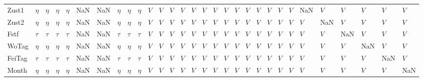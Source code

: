\begin{tabular}{llllllllllllllllllllllllllllll}
Zust1  &    $\eta$ &    $\eta$ &    $\eta$ &    $\eta$ &   NaN &   NaN &    $\eta$ &    $\eta$ &    $\eta$ &     $V$ &     $V$ &     $V$ &     $V$ &     $V$ &     $V$ &     $V$ &     $V$ &     $V$ &       $V$ &     $V$ &     $V$ &     $V$ &     $V$ &     NaN &     $V$ &     $V$ &     $V$ &     $V$ &     $V$ \\
Zust2  &    $\eta$ &    $\eta$ &    $\eta$ &    $\eta$ &   NaN &   NaN &    $\eta$ &    $\eta$ &    $\eta$ &     $V$ &     $V$ &     $V$ &     $V$ &     $V$ &     $V$ &     $V$ &     $V$ &     $V$ &       $V$ &     $V$ &     $V$ &     $V$ &     $V$ &     $V$ &     NaN &     $V$ &     $V$ &     $V$ &     $V$ \\
Fstf   &    $\tau$ &    $\tau$ &    $\tau$ &    $\tau$ &   NaN &   NaN &    $\tau$ &    $\tau$ &    $\tau$ &     $V$ &     $V$ &     $V$ &     $V$ &     $V$ &     $V$ &     $V$ &     $V$ &     $V$ &       $V$ &     $V$ &     $V$ &     $V$ &     $V$ &     $V$ &     $V$ &     NaN &     $V$ &     $V$ &     $V$ \\
WoTag  &    $\eta$ &    $\eta$ &    $\eta$ &    $\eta$ &   NaN &   NaN &    $\eta$ &    $\eta$ &    $\eta$ &     $V$ &     $V$ &     $V$ &     $V$ &     $V$ &     $V$ &     $V$ &     $V$ &     $V$ &       $V$ &     $V$ &     $V$ &     $V$ &     $V$ &     $V$ &     $V$ &     $V$ &     NaN &     $V$ &     $V$ \\
FeiTag &    $\tau$ &    $\tau$ &    $\tau$ &    $\tau$ &   NaN &   NaN &    $\tau$ &    $\tau$ &    $\tau$ &     $V$ &     $V$ &     $V$ &     $V$ &     $V$ &     $V$ &     $V$ &     $V$ &     $V$ &       $V$ &     $V$ &     $V$ &     $V$ &     $V$ &     $V$ &     $V$ &     $V$ &     $V$ &     NaN &     $V$ \\
Month  &    $\eta$ &    $\eta$ &    $\eta$ &    $\eta$ &   NaN &   NaN &    $\eta$ &    $\eta$ &    $\eta$ &     $V$ &     $V$ &     $V$ &     $V$ &     $V$ &     $V$ &     $V$ &     $V$ &     $V$ &       $V$ &     $V$ &     $V$ &     $V$ &     $V$ &     $V$ &     $V$ &     $V$ &     $V$ &     $V$ &     NaN \\
\bottomrule
\end{tabular}

